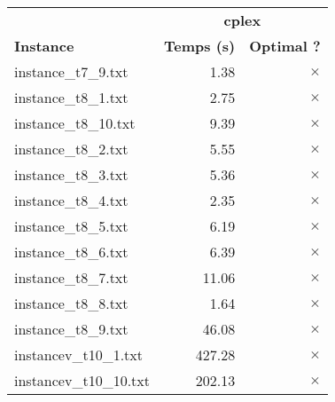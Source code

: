 \documentclass{article}
\begin{document}
\newpage
\begin{center}
\renewcommand{\arraystretch}{1.4} 
 \begin{tabular}{lrr}
	\hline
 & \multicolumn{2}{c}{\textbf{cplex}}\\
\textbf{Instance}  & \textbf{Temps (s)} & \textbf{Optimal ?} \\\hline

instance\_t7\_9.txt & 1.38 & 
$\times$
\\
instance\_t8\_1.txt & 2.75 & 
$\times$
\\
instance\_t8\_10.txt & 9.39 & 
$\times$
\\
instance\_t8\_2.txt & 5.55 & 
$\times$
\\
instance\_t8\_3.txt & 5.36 & 
$\times$
\\
instance\_t8\_4.txt & 2.35 & 
$\times$
\\
instance\_t8\_5.txt & 6.19 & 
$\times$
\\
instance\_t8\_6.txt & 6.39 & 
$\times$
\\
instance\_t8\_7.txt & 11.06 & 
$\times$
\\
instance\_t8\_8.txt & 1.64 & 
$\times$
\\
instance\_t8\_9.txt & 46.08 & 
$\times$
\\
instancev\_t10\_1.txt & 427.28 & 
$\times$
\\
instancev\_t10\_10.txt & 202.13 & 
$\times$
\\
\hline\end{tabular}
\end{center}
\end{document}
